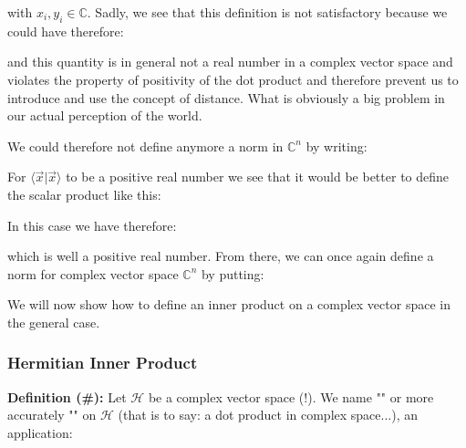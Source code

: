 	with $x_i,y_i\in \mathbb{C}$.
	Sadly, we see that this definition is not satisfactory because we could have therefore:
	
	and this quantity is in general not a real number in a complex vector space and violates the property of positivity of the dot product and therefore prevent us to introduce and use the concept of distance. What is obviously a big problem in our actual perception of the world.
	
	We could therefore not define anymore a norm in $\mathbb{C}^n$ by writing:
	
	For $\langle \vec{x}|\vec{x}\rangle$ to be a positive real number we see that it would be better to define the scalar product like this:
	
	In this case we have therefore:
	
	which is well a positive real number. From there, we can once again define a norm for complex vector space $\mathbb{C}^n$ by putting:
	
	We will now show how to define an inner product on a complex vector space in the general case.
	
	\subsubsection{Hermitian Inner Product}
	\textbf{Definition (\#\mydef):} Let $\mathcal{H}$ be a complex vector space (!). We name "" or more accurately "" on $\mathcal{H}$ (that is to say: a dot product in complex space...), an application:
	
